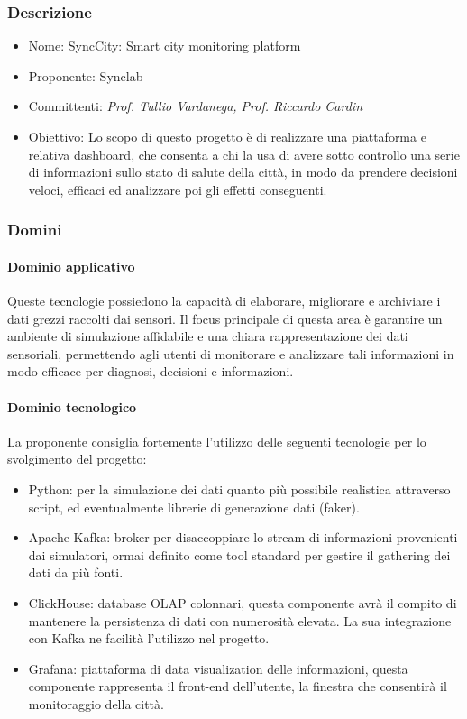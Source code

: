 \documentclass[italian,12pt]{article} %
\begin{document}
\subsubsection{Descrizione}
\begin{itemize}
	\item Nome: SyncCity: Smart city monitoring platform
	\item Proponente: Synclab
	\item Committenti: {\it Prof. Tullio Vardanega, Prof. Riccardo Cardin}
	\item Obiettivo: Lo scopo di questo progetto è di realizzare una piattaforma e relativa dashboard, che consenta a chi la usa di avere sotto controllo una serie di informazioni sullo stato di salute della città, in modo da prendere decisioni veloci, efficaci ed analizzare poi gli effetti conseguenti.
\end{itemize}

\subsubsection{Domini}
\paragraph{Dominio applicativo}
Queste tecnologie possiedono la capacità di elaborare, migliorare e archiviare i dati grezzi raccolti dai sensori. Il focus principale di questa area è garantire un ambiente di simulazione affidabile e una chiara rappresentazione dei dati sensoriali, permettendo agli utenti di monitorare e analizzare tali informazioni in modo efficace per diagnosi, decisioni e informazioni.
\paragraph{Dominio tecnologico}
La proponente consiglia fortemente l'utilizzo delle seguenti tecnologie per lo svolgimento del progetto:
\begin{itemize}
	\item Python: per la simulazione dei dati quanto più possibile realistica attraverso script, ed eventualmente librerie di generazione dati (faker).
	\item Apache Kafka: broker per disaccoppiare lo stream di informazioni provenienti dai simulatori, ormai definito come tool standard per gestire il gathering dei dati da più fonti.
	\item ClickHouse: database OLAP colonnari, questa componente avrà il compito di mantenere la persistenza di dati con numerosità elevata. La sua integrazione con Kafka ne facilità l'utilizzo nel progetto.
	\item Grafana: piattaforma di data visualization delle informazioni, questa componente rappresenta il front-end dell'utente, la finestra che consentirà il monitoraggio della città.
\end{itemize}
\end{document}
